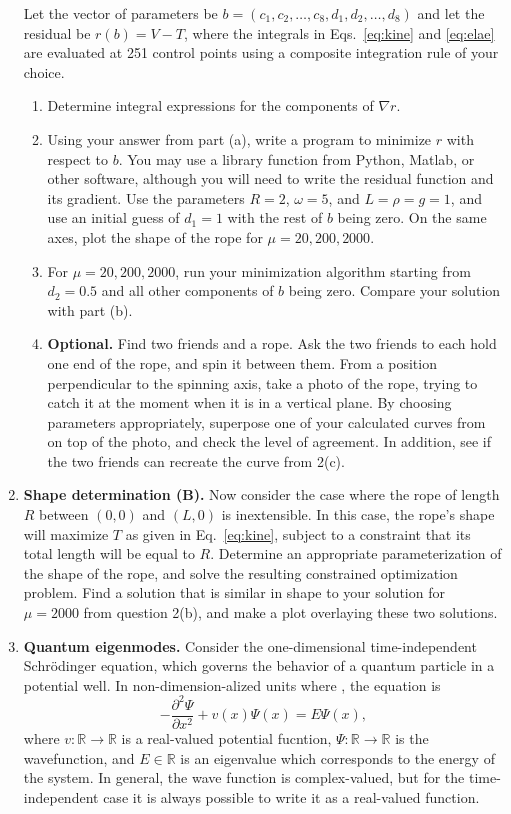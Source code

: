 \documentclass[11pt]{article}
\newcommand{\R}{\mathbb{R}}
\newcommand{\p}{\partial}
\begin{document}
\begin{enumerate}
    Let the vector of parameters be $b=(c_1,c_2,\ldots,c_8,d_1,d_2,\ldots,d_8)$
    and let the residual be $r(b)=V-T$, where the integrals in
    Eqs.~\ref{eq:kine} and \ref{eq:elae} are evaluated at 251 control points
    using a composite integration rule of your choice.
    \begin{enumerate}
      \item Determine integral expressions for the components of $\nabla r$.
      \item Using your answer from part (a), write a program to minimize $r$
	with respect to $b$. You may use a library function from Python, Matlab,
	or other software, although you will need to write the residual
	function and its gradient. Use the parameters $R=2$, $\omega=5$, and
	$L=\rho=g=1$, and use an initial guess of $d_1=1$ with the rest of $b$
	being zero. On the same axes, plot the shape of the rope for
	$\mu=20,200,2000$.
      \item For $\mu=20,200,2000$, run your minimization algorithm starting
	from $d_2=0.5$ and all other components of $b$ being zero. Compare your
	solution with part (b).
      \item {\bf Optional.} Find two friends and a rope. Ask the two friends to
	each hold one end of the rope, and spin it between them. From a
	position perpendicular to the spinning axis, take a photo of the rope,
	trying to catch it at the moment when it is in a vertical plane.
	By choosing parameters appropriately, superpose one of your calculated
	curves from on top of the photo, and check the level of agreement. In
	addition, see if the two friends can recreate the curve from 2(c).	
    \end{enumerate}
  \item \textbf{Shape determination (B).} Now consider the case where the rope
    of length $R$ between $(0,0)$ and $(L,0)$ is inextensible. In this case,
    the rope's shape will maximize $T$ as given in Eq.~\ref{eq:kine}, subject
    to a constraint that its total length will be equal to $R$. Determine an
    appropriate parameterization of the shape of the rope, and solve the
    resulting constrained optimization problem. Find a solution that is similar
    in shape to your solution for $\mu=2000$ from question 2(b), and make a
    plot overlaying these two solutions.
  \item \textbf{Quantum eigenmodes.} Consider the one-dimensional time-independent
    Schr\"odinger equation, which governs the behavior of a quantum particle
    in a potential well. In non-dimension-alized units where ,
    the equation is
    \begin{equation}
      - \frac{\p^2 \Psi}{\p x^2} + v(x) \Psi(x) = E\Psi(x), \label{eq:schrod}
    \end{equation}
    where $v:\R \to \R$ is a real-valued potential fucntion, $\Psi:\R \to \R$
    is the wavefunction, and $E\in \R$ is an eigenvalue which corresponds to
    the energy of the system. In general, the wave function is complex-valued,
    but for the time-independent case it is always possible to write it as a
    real-valued function.


\end{enumerate}
\end{document}

